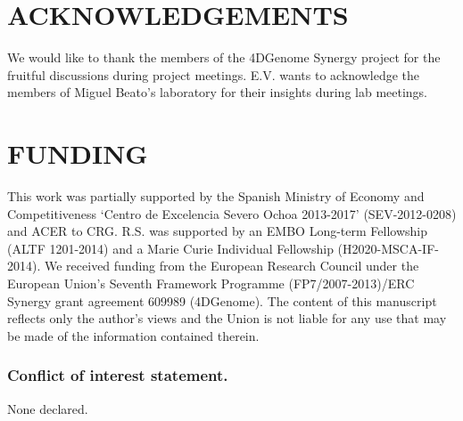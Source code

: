 \documentclass[a4,center,fleqn]{NAR}
\begin{document}
\section{ACKNOWLEDGEMENTS}

We would like to thank the members of the 4DGenome Synergy project for the
fruitful discussions during project meetings. E.V. wants to acknowledge
the members of Miguel Beato's laboratory for their insights during lab
meetings.


\section{FUNDING}

This work was partially supported by the Spanish Ministry of Economy and
Competitiveness `Centro de Excelencia Severo Ochoa 2013-2017'
(SEV-2012-0208) and ACER to CRG. R.S. was supported by an EMBO Long-term
Fellowship (ALTF 1201-2014) and a Marie Curie Individual Fellowship
(H2020-MSCA-IF-2014). We received funding from the European Research
Council under the European Union's Seventh Framework Programme
(FP7/2007-2013)/ERC Synergy grant agreement 609989 (4DGenome). The content
of this manuscript reflects only the author's views and the Union is not
liable for any use that may be made of the information contained therein.

\subsubsection{Conflict of interest statement.} None declared.
\newpage



\end{document}
